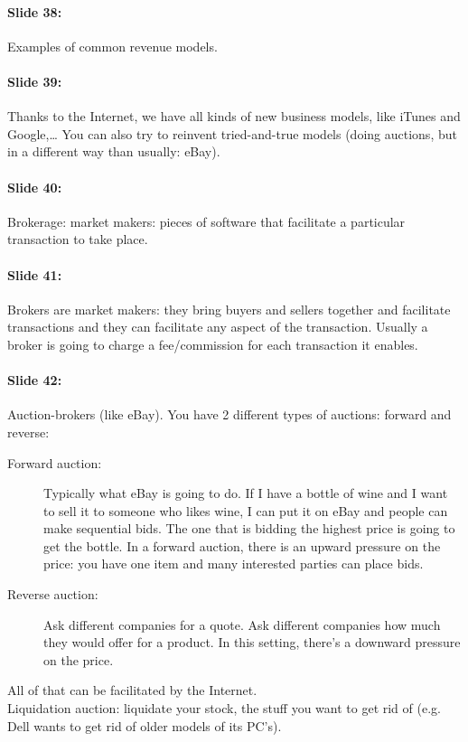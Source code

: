 \documentclass[10pt,a4paper]{report}
\begin{document}
\paragraph{Slide 38:}Examples of common revenue models.

\paragraph{Slide 39:}Thanks to the Internet, we have all kinds of new business models, like iTunes and Google,… You can also try to reinvent tried-and-true models (doing auctions, but in a different way than usually: eBay).

\paragraph{Slide 40:}Brokerage: market makers: pieces of software that facilitate a particular transaction to take place.

\paragraph{Slide 41:}Brokers are market makers: they bring buyers and sellers together and facilitate transactions and they can facilitate any aspect of the transaction. Usually a broker is going to charge a fee/commission for each transaction it enables.

\paragraph{Slide 42:}Auction-brokers (like eBay). You have 2 different types of auctions: forward and reverse:
\begin{description}
\item[Forward auction:]Typically what eBay is going to do. If I have a bottle of wine and I want to sell it to someone who likes wine, I can put it on eBay and people can make sequential bids. The one that is bidding the highest price is going to get the bottle. In a forward auction, there is an upward pressure on the price: you have one item and many interested parties can place bids.
\item[Reverse auction:]Ask different companies for a quote. Ask different companies how much they would offer for a product. In this setting, there's a downward pressure on the price.
\end{description}
All of that can be facilitated by the Internet.\\
Liquidation auction: liquidate your stock, the stuff you want to get rid of (e.g. Dell wants to get rid of older models of its PC's). 
\end{document}
